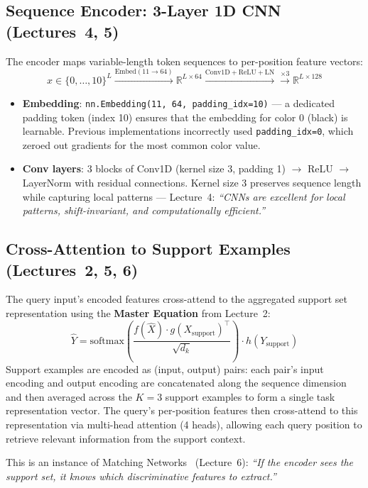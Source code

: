 \documentclass[11pt,a4paper]{article}
\begin{document}
\subsection{Sequence Encoder: 3-Layer 1D CNN (Lectures~4, 5)}
The encoder maps variable-length token sequences to per-position feature vectors:
\begin{equation}
  x \in \{0,\ldots,10\}^L \xrightarrow{\text{Embed}(11 \to 64)} \mathbb{R}^{L\times64} \xrightarrow{\text{Conv1D}+\text{ReLU}+\text{LN}} \xrightarrow{\times 3} \mathbb{R}^{L\times128}
\end{equation}
\begin{itemize}[nosep]
  \item \textbf{Embedding}: \texttt{nn.Embedding(11, 64, padding\_idx=10)} --- a dedicated padding token (index 10) ensures that the embedding for color 0 (black) is learnable. Previous implementations incorrectly used \texttt{padding\_idx=0}, which zeroed out gradients for the most common color value.
  \item \textbf{Conv layers}: 3 blocks of Conv1D (kernel size 3, padding 1) $\to$ ReLU $\to$ LayerNorm with residual connections. Kernel size 3 preserves sequence length while capturing local patterns --- Lecture~4: \emph{``CNNs are excellent for local patterns, shift-invariant, and computationally efficient.''}
\end{itemize}

\subsection{Cross-Attention to Support Examples (Lectures~2, 5, 6)}
The query input's encoded features cross-attend to the aggregated support set representation using the \textbf{Master Equation} from Lecture~2:
\begin{equation}
  \hat{Y} = \text{softmax}\!\left(\frac{f(\hat{X}) \cdot g(X_{\text{support}})^\top}{\sqrt{d_k}}\right) \cdot h(Y_{\text{support}})
\end{equation}
Support examples are encoded as (input, output) pairs: each pair's input encoding and output encoding are concatenated along the sequence dimension and then averaged across the $K=3$ support examples to form a single task representation vector. The query's per-position features then cross-attend to this representation via multi-head attention (4 heads), allowing each query position to retrieve relevant information from the support context.

This is an instance of Matching Networks~\cite{vinyals2016} (Lecture~6): \emph{``If the encoder sees the support set, it knows which discriminative features to extract.''}
\end{document}
